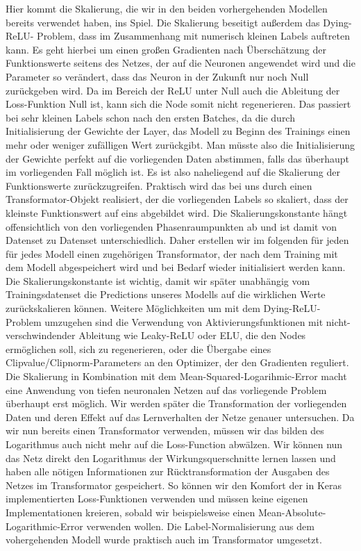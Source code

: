 Hier kommt die Skalierung, die wir in den beiden vorhergehenden Modellen bereits verwendet haben, ins Spiel. Die Skalierung beseitigt außerdem das \glqq Dying-ReLU\grqq- Problem, dass im Zusammenhang mit numerisch kleinen Labels auftreten kann. Es geht hierbei um einen großen Gradienten nach Überschätzung der Funktionswerte seitens des Netzes, der auf die Neuronen angewendet wird und die Parameter so verändert, dass das Neuron in der Zukunft nur noch Null zurückgeben wird. Da im Bereich der ReLU unter Null auch die Ableitung der Loss-Funktion Null ist, kann sich die Node somit nicht regenerieren. Das passiert bei sehr kleinen Labels schon nach den ersten Batches, da die durch Initialisierung der Gewichte der Layer, das Modell zu Beginn des Trainings einen mehr oder weniger zufälligen Wert zurückgibt. Man müsste also die Initialisierung der Gewichte perfekt auf die vorliegenden Daten abstimmen, falls das überhaupt im vorliegenden Fall möglich ist. Es ist also naheliegend auf die Skalierung der Funktionswerte zurückzugreifen. Praktisch wird das bei uns durch einen Transformator-Objekt realisiert, der die vorliegenden Labels so skaliert, dass der kleinste Funktionswert auf eins abgebildet wird. Die Skalierungskonstante hängt offensichtlich von den vorliegenden Phasenraumpunkten ab und ist damit von Datenset zu Datenset unterschiedlich. Daher erstellen wir im folgenden für jeden für jedes Modell einen zugehörigen Transformator, der nach dem Training mit dem Modell abgespeichert wird und bei Bedarf wieder initialisiert werden kann. Die Skalierungskonstante ist wichtig, damit wir später unabhängig vom Trainingsdatenset die Predictions unseres Modells auf die wirklichen Werte zurückskalieren können. Weitere Möglichkeiten um mit dem \glqq Dying-ReLU\grqq-Problem umzugehen sind die Verwendung von Aktivierungsfunktionen mit nicht-verschwindender Ableitung wie Leaky-ReLU oder ELU, die den Nodes ermöglichen soll, sich zu regenerieren, oder die Übergabe eines \glqq  Clipvalue/Clipnorm\grqq-Parameters an den Optimizer, der den Gradienten reguliert. 
Die Skalierung in Kombination mit dem Mean-Squared-Logarihmic-Error macht eine Anwendung von tiefen neuronalen Netzen auf das vorliegende Problem überhaupt erst möglich. Wir werden später die Transformation der vorliegenden Daten und deren Effekt auf das Lernverhalten der Netze genauer untersuchen. Da wir nun bereits einen Transformator verwenden, müssen wir das bilden des Logarithmus auch nicht mehr auf die Loss-Function abwälzen. Wir können nun das Netz direkt den Logarithmus der Wirkungsquerschnitte lernen lassen und haben alle nötigen Informationen zur Rücktransformation der Ausgaben des Netzes im Transformator gespeichert. So können wir den Komfort der in Keras implementierten Loss-Funktionen verwenden und müssen keine eigenen Implementationen kreieren, sobald wir beispielsweise einen Mean-Absolute-Logarithmic-Error verwenden wollen. Die Label-Normalisierung aus dem vohergehenden Modell wurde praktisch auch im Transformator umgesetzt.
